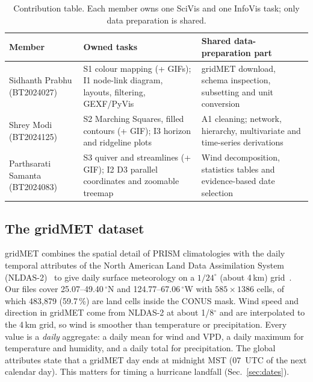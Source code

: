 \begin{table}[!t]
\centering
\caption{Contribution table. Each member owns one SciVis and one InfoVis task; only data preparation is shared.}
\label{tab:contrib}
\footnotesize
\begin{tabular}{p{1.9cm}p{2.9cm}p{2.8cm}}
\toprule
Member & Owned tasks & Shared data-preparation part \\
\midrule
Sidhanth Prabhu (BT2024027) & S1 colour mapping (+ GIFs); I1 node-link diagram, layouts, filtering, GEXF/PyVis & gridMET download, schema inspection, subsetting and unit conversion \\
Shrey Modi (BT2024125) & S2 Marching Squares, filled contours (+ GIF); I3 horizon and ridgeline plots & A1 cleaning; network, hierarchy, multivariate and time-series derivations \\
Parthsarati Samanta (BT2024083) & S3 quiver and streamlines (+ GIF); I2 D3 parallel coordinates and zoomable treemap & Wind decomposition, statistics tables and evidence-based date selection \\
\bottomrule
\end{tabular}
\end{table}

\subsection{The gridMET dataset}
gridMET combines the spatial detail of PRISM climatologies with the daily temporal attributes of the North American Land
Data Assimilation System (NLDAS-2)~\cite{mitchell2004nldas} to give daily surface meteorology on a
$1/24^\circ$ (about 4\,km) grid~\cite{abatzoglou2013}. Our files cover 25.07--49.40\,$^\circ$N and 124.77--67.06\,$^\circ$W
with $585\times1386$ cells, of which 483,879 (59.7\,\%) are land cells inside the CONUS mask. Wind speed and direction in gridMET
come from NLDAS-2 at about 1/8$^\circ$ and are interpolated to the 4\,km grid,
so wind is smoother than temperature or precipitation. Every value is a \emph{daily} aggregate: a daily mean
for wind and VPD, a daily maximum for temperature and humidity, and a daily total for precipitation. The global attributes state that a gridMET day
ends at midnight MST (07~UTC of the next calendar day). This matters for timing a hurricane landfall
(Sec.~\ref{sec:dates}).


